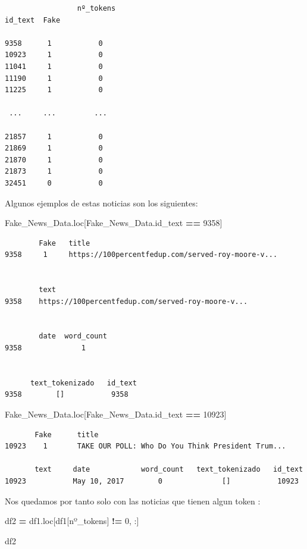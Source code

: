 \documentclass[
  11pt,
  a4paper,
]{article}
\newenvironment{Shaded}{\begin{snugshade}}{\end{snugshade}}
\newcommand{\DecValTok}[1]{\textcolor[rgb]{0.00,0.00,0.81}{#1}}
\newcommand{\NormalTok}[1]{#1}
\newcommand{\OperatorTok}[1]{\textcolor[rgb]{0.81,0.36,0.00}{\textbf{#1}}}
\newcommand{\StringTok}[1]{\textcolor[rgb]{0.31,0.60,0.02}{#1}}
\begin{document}
\begin{verbatim}
                 nº_tokens
id_text  Fake           

9358      1           0
10923     1           0
11041     1           0
11190     1           0
11225     1           0

 ...     ...         ...

21857     1           0
21869     1           0
21870     1           0
21873     1           0
32451     0           0
\end{verbatim}

Algunos ejemplos de estas noticias son los siguientes:

\begin{Shaded}
\begin{Highlighting}[]
\NormalTok{Fake\_News\_Data.loc[Fake\_News\_Data.id\_text }\OperatorTok{==} \DecValTok{9358}\NormalTok{]}
\end{Highlighting}
\end{Shaded}

\begin{verbatim}
        Fake   title  
9358     1     https://100percentfedup.com/served-roy-moore-v...   


        text  
9358    https://100percentfedup.com/served-roy-moore-v...   


        date  word_count  
9358              1   


      text_tokenizado   id_text  
9358        []           9358  
\end{verbatim}

\begin{Shaded}
\begin{Highlighting}[]
\NormalTok{Fake\_News\_Data.loc[Fake\_News\_Data.id\_text }\OperatorTok{==} \DecValTok{10923}\NormalTok{]}
\end{Highlighting}
\end{Shaded}

\begin{verbatim}
       Fake      title 
10923    1       TAKE OUR POLL: Who Do You Think President Trum...        

       text     date            word_count   text_tokenizado   id_text  
10923           May 10, 2017        0              []           10923
\end{verbatim}

Nos quedamos por tanto solo con las noticias que tienen algun token :

\begin{Shaded}
\begin{Highlighting}[]
\NormalTok{df2 }\OperatorTok{=}\NormalTok{ df1.loc[df1[}\StringTok{\textquotesingle{}nº\_tokens\textquotesingle{}}\NormalTok{] }\OperatorTok{!=} \DecValTok{0}\NormalTok{, :]}

\NormalTok{df2}
\end{Highlighting}
\end{Shaded}
\end{document}
